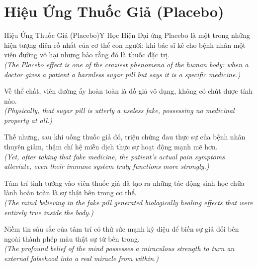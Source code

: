 \section{Hiệu Ứng Thuốc Giả (Placebo)}
\begin{truyen}{Hiệu Ứng Thuốc Giả (Placebo)}{Y Học Hiện Đại}
 ứng Placebo là một trong những hiện tượng điên rồ nhất của cơ thể con người: khi bác sĩ kê cho bệnh nhân một viên đường vô hại nhưng bảo rằng đó là thuốc đặc trị.\\[4pt]
\textit{(The Placebo effect is one of the craziest phenomena of the human body: when a doctor gives a patient a harmless sugar pill but says it is a specific medicine.)}

Về thể chất, viên đường ấy hoàn toàn là đồ giả vô dụng, không có chút dược tính nào.\\[4pt]
\textit{(Physically, that sugar pill is utterly a useless fake, possessing no medicinal property at all.)}

Thế nhưng, sau khi uống thuốc giả đó, triệu chứng đau thực sự của bệnh nhân thuyên giảm, thậm chí hệ miễn dịch thực sự hoạt động mạnh mẽ hơn.\\[4pt]
\textit{(Yet, after taking that fake medicine, the patient's actual pain symptoms alleviate, even their immune system truly functions more strongly.)}

Tâm trí tinh tưởng vào viên thuốc giả đã tạo ra những tác động sinh học chữa lành hoàn toàn là sự thật bên trong cơ thể.\\[4pt]
\textit{(The mind believing in the fake pill generated biologically healing effects that were entirely true inside the body.)}

\end{truyen}
\begin{baihoc}
  Niềm tin sâu sắc của tâm trí có thứ sức mạnh kỳ diệu để biến sự giả dối bên ngoài thành phép màu thật sự từ bên trong.\\[4pt]
  \textit{(The profound belief of the mind possesses a miraculous strength to turn an external falsehood into a real miracle from within.)}
\end{baihoc}

